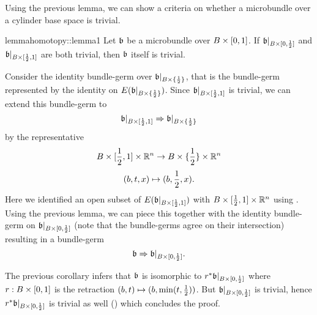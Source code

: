 \begin{scope}
    \newcommand{\bbleft} {
        \bb[B \cross [0, \half]]
    }
    \newcommand{\bbright} {
        \bb[B \cross [\half, 1]]
    }
    \newcommand{\bbhalf} {
        \bb[B \cross \coll{\half{}}]
    }

    \begin{myparagraph}
        Using the previous lemma,
        we can show a criteria on whether a microbundle
        over a cylinder base space is trivial.        
    \end{myparagraph}

    \begin{mystatement}{lemma}{homotopy::lemma1}
        Let $\bb$ be a microbundle over $B \times{} [0, 1]$. If $\bbleft$ and $\bbright$ are both trivial,
        then $\bb$ itself is trivial.
    \end{mystatement}

    \begin{myproof}
        Consider the identity bundle-germ over $\bbhalf$, that is the bundle-germ represented by the identity on $E(\bbhalf)$.
        Since $\bbright$ is trivial, we can extend this bundle-germ to 
        \[ \germ{\bbright}{\bbhalf} \]
        by the representative
        \[ B \times [\frac{1}{2}, 1] \times \mathbb{R}^n \to B \times \{\frac{1}{2}\} \times \mathbb{R}^n \]
        \[ (b, t, x) \mapsto (b, \frac{1}{2}, x). \]
        Here we identified an open subset of $E(\bb[B \cross [\half, 1]])$ with $B \times [\frac{1}{2}, 1] \times \mathbb{R}^n$ using .
        Using the previous lemma, we can piece this together with the identity bundle-germ on $\bbleft$ (note that the bundle-germs agree on their intersection) resulting in a bundle-germ
        \[ \germ{\bb}{\bbleft}. \]

        The previous corollary infers that $\bb$ is isomorphic to $\ind{r}\bbleft$ where $r: B \times [0, 1]$ is the retraction $(b, t) \mapsto (b, \min(t, \frac{1}{2}))$.
        But $\bbleft$ is trivial, hence $\ind{r}\bbleft$ is trivial as well () which concludes the proof.
    \end{myproof}
\end{scope}